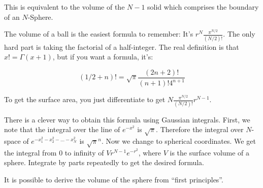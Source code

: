 This is equivalent to the volume of the $N-1$ solid which comprises the
boundary of an $N$-Sphere.

The volume of a ball is the easiest formula to remember: It's $r^N
\frac{\pi^{N/2}}{(N/2)!}$.  The only hard part is taking the factorial
of a half-integer.  The real definition is that $x! = \Gamma(x+1)$, but
if you want a formula, it's:

\[
(1/2+n)! = \sqrt{\pi} \frac{(2n+2)!}{(n+1)!4^{n+1}}
\]

To get the surface area, you just differentiate to get
$N\frac{\pi^{N/2}}{(N/2)!}r^{N-1}$.

There is a clever way to obtain this formula using Gaussian
integrals. First, we note that the integral over the line of $e^{-x^2}$
is $\sqrt{\pi}$.  Therefore the integral over $N$-space of
$e^{-x_1^2-x_2^2-...-x_N^2}$ is $\sqrt{\pi}^n$.  Now we change to
spherical coordinates.  We get the integral from 0 to infinity of
$Vr^{N-1}e^{-r^2}$, where $V$ is the surface volume of a sphere.
Integrate by parts repeatedly to get the desired formula.

It is possible to derive the volume of the sphere from ``first
principles''.
